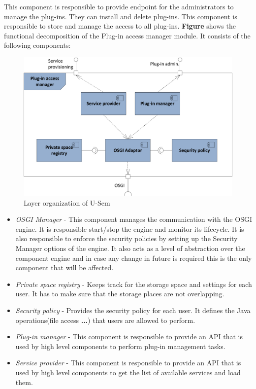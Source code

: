This component is responsible to provide endpoint for the administrators to manage the plug-ins. They can install and delete plug-ins. This component is responsible to store and manage the access to all plug-ins. \textbf{Figure} shows the functional decomposition of the Plug-in access manager module. It consists of the following components:


\begin{figure}[h!]
  \centering
  	\includegraphics[scale=0.85]{plug-in/layers/access-func.png}
  \caption{Layer organization of U-Sem}
\end{figure}

\begin{itemize}

\item \textit{OSGI Manager} - This component manages the communication with the OSGI engine. It is responsible start/stop the engine and monitor its lifecycle. It is also responsible to enforce the security policies by setting up the Security Manager options of the engine. It also acts as a level of abstraction over the component engine and in case any change in future is required this is the only component that will be affected. 

\item \textit{Private space registry} - Keeps track for the storage space and settings for each user. It has to make sure that the storage places are not overlapping.  

\item \textit{Security policy} - Provides the security policy for each user. It defines the Java operations(file access \textbf{...}) that users are allowed to perform.

\item \textit{Plug-in manager} - This component is responsible to provide an API that is used by high level components to perform plug-in management tasks.

\item \textit{Service provider} - This component is responsible to provide an API that is used by high level components to get the list of available services and load them.

\end{itemize}

